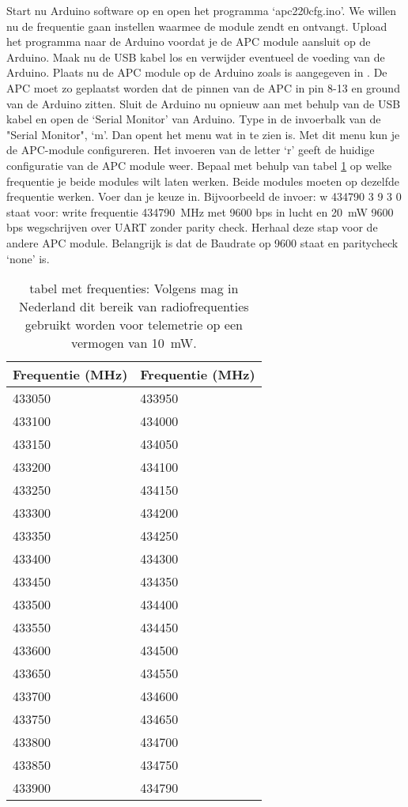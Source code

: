 Start nu Arduino software op en open het programma `apc220cfg.ino'. We
willen nu de frequentie gaan instellen waarmee de module zendt en
ontvangt. Upload het programma naar de Arduino voordat je de APC module
aansluit op de Arduino. Maak nu de USB kabel los en verwijder eventueel
de voeding van de Arduino. Plaats nu de APC module op de Arduino zoals
is aangegeven in . De APC moet zo
geplaatst worden dat de pinnen van de APC in pin 8-13 en ground van de
Arduino zitten. Sluit de Arduino nu opnieuw aan met behulp van de USB
kabel en open de `Serial Monitor' van Arduino. Type in de invoerbalk van
de "Serial Monitor", `m'. Dan opent het menu wat in
 te zien is. Met dit menu kun je de APC-module
configureren. Het invoeren van de letter `r' geeft de huidige
configuratie van de APC module weer. Bepaal met behulp van tabel
\ref{table:frequenties} op welke frequentie je beide modules wilt laten
werken. Beide modules moeten op dezelfde frequentie werken. Voer dan je
keuze in. Bijvoorbeeld de invoer: w 434790 3 9 3 0 staat voor: write
frequentie \SI{434790}{\MHz} met 9600 bps in lucht en
\SI{20}{\milli\watt} 9600 bps wegschrijven over UART zonder parity check.
Herhaal deze stap voor de andere APC module. Belangrijk is dat de Baudrate op 
9600 staat en paritycheck `none' is.

\begin{table}
    \centering
    \begin{tabular}{ l l }
        \hline
        Frequentie (\si{\mega\hertz}) & Frequentie (\si{\mega\hertz}) \\
        \hline
        433050 & 433950 \\
        433100 & 434000 \\
        433150 & 434050 \\
        433200 & 434100 \\
        433250 & 434150 \\
        433300 & 434200 \\
        433350 & 434250 \\
        433400 & 434300 \\
        433450 & 434350 \\
        433500 & 434400 \\
        433550 & 434450 \\
        433600 & 434500 \\
        433650 & 434550 \\
        433700 & 434600 \\
        433750 & 434650 \\
        433800 & 434700 \\
        433850 & 434750 \\
        433900 & 434790 \\
        \hline
    \end{tabular}
    \caption{tabel met frequenties: Volgens \cite{Radio} mag in Nederland
             dit bereik van radiofrequenties gebruikt worden voor telemetrie
             op een vermogen van \SI{10}{\milli\watt}.}
    \label{table:frequenties}
\end{table}


